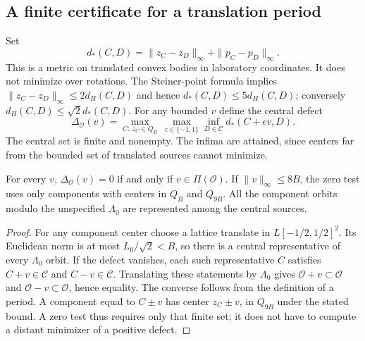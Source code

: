 \subsection{A finite certificate for a translation period}
Set
\begin{equation}\label{eq:repeatmetric}
 d_*(C,D)=\|z_C-z_D\|_\infty+\|p_C-p_D\|_\infty.
\end{equation}
This is a metric on translated convex bodies in laboratory coordinates.
It does not minimize over rotations. The Steiner-point formula implies
$\|z_C-z_D\|_\infty\le2d_H(C,D)$ and hence
$d_*(C,D)\le5d_H(C,D)$; conversely $d_H(C,D)\le\sqrt2d_*(C,D)$.
For any bounded $v$ define the central defect
\begin{equation}\label{eq:repeatdefect}
 \Delta_{\mathcal O}(v)=
 \max_{C:\ z_C\in Q_B}\ \max_{\epsilon\in\{-1,1\}}
          \inf_{D\in\mathcal C}d_*(C+\epsilon v,D).
\end{equation}
The central set is finite and nonempty. The infima are attained, since
centers far from the bounded set of translated sources cannot minimize.

\begin{lemma}\label{lem:period-local}
For every $v$, $\Delta_{\mathcal O}(v)=0$ if and only if
$v\in\Pi(\mathcal O)$. If $\|v\|_\infty\le8B$, the zero test uses
only components with centers in $Q_B$ and $Q_{9B}$. All the component
orbits modulo the unspecified $\Lambda_0$ are represented among the
central sources.
\end{lemma}
\begin{proof}
For any component center choose a lattice translate in
$L[-1/2,1/2]^2$. Its Euclidean norm is at most $L_0/\sqrt2<B$, so
there is a central representative of every $\Lambda_0$ orbit. If the
defect vanishes, each such representative $C$ satisfies
$C+v\in\mathcal C$ and $C-v\in\mathcal C$. Translating these statements
by $\Lambda_0$ gives $\mathcal O+v\subset\mathcal O$ and
$\mathcal O-v\subset\mathcal O$, hence equality. The converse follows
from the definition of a period. A component equal to $C\pm v$ has
center $z_C\pm v$, in $Q_{9B}$ under the stated bound. A zero test thus
requires only that finite set; it does not have to compute a distant
minimizer of a positive defect.
\end{proof}

